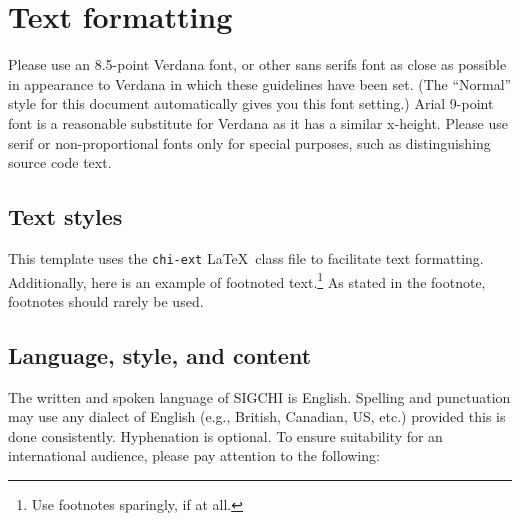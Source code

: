 \documentclass{chi-ext}
\begin{document}
\section{Text formatting}
Please use an 8.5-point Verdana font, or other sans serifs font as close as possible in appearance to Verdana in which these guidelines have been set. 
(The ``Normal'' style for this document automatically gives you this font setting.)
Arial 9-point font is a reasonable substitute for Verdana as it has a similar x-height. 
Please use serif or non-proportional fonts only for special purposes, such as distinguishing source code text.

\subsection{Text styles}
This template uses the \texttt{chi-ext} \LaTeX\ class file to facilitate text formatting.
Additionally, here is an example of footnoted text.\footnote{Use footnotes sparingly, if at all.}
As stated in the footnote, footnotes should rarely be used.

\subsection{Language, style, and content}
The written and spoken language of SIGCHI is English. 
Spelling and punctuation may use any dialect of English (e.g., British, Canadian, US, etc.) provided this is done consistently. 
Hyphenation is optional. 
To ensure suitability for an international audience, please pay attention to the following:
\end{document}
